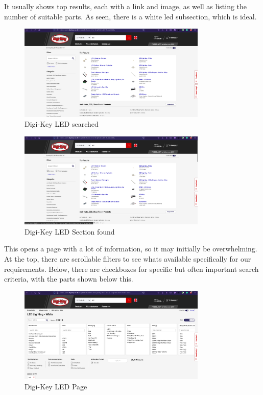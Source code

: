 \documentclass[a4paper,11pt]{report}
\begin{document}
It usually shows top results, each with a link and image, as well as listing the number of suitable parts. As seen, there is a white \gls{led} subsection, which is ideal.

\begin{figure}[H]
\centering
\includegraphics[width=0.8\textwidth]{screenshots/DigiKeyLEDSearched}
\caption{Digi-Key LED searched}
\end{figure}
\begin{figure}[H]
\centering
\includegraphics[width=0.8\textwidth]{screenshots/DigiKeyWhiteLEDSectionFound}
\caption{Digi-Key LED Section found}
\end{figure}

This opens a page with a lot of information, so it may initially be overwhelming. At the top, there are scrollable filters to see whats available specifically for our requirements. Below, there are checkboxes for specific but often important search criteria, with the parts shown below this.

\begin{figure}[H]
\centering
\includegraphics[width=0.8\textwidth]{screenshots/DigiKeyWhiteLEDPage}
\caption{Digi-Key LED Page}
\end{figure}
\end{document}
